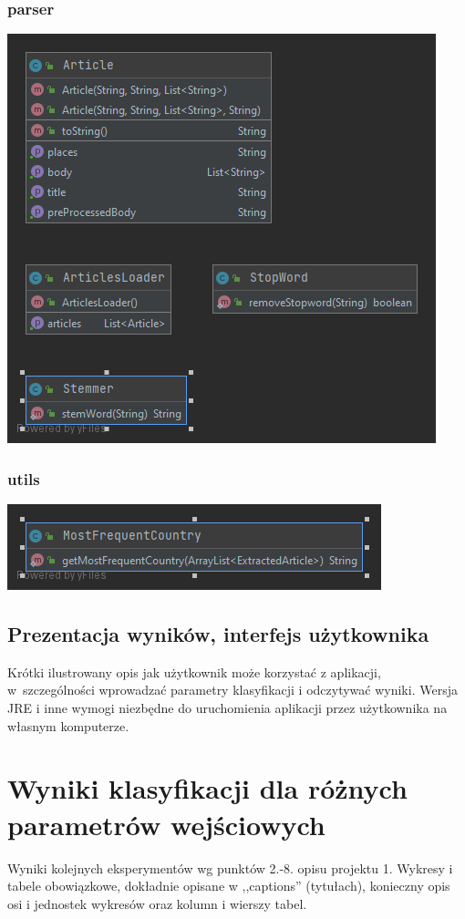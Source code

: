 \documentclass{classrep}
\begin{document}
\subsubsection{parser}
\includegraphics[scale=0.5]{Package parser}
\subsubsection{utils}
\includegraphics[scale=0.5]{Package utils}

\subsection{Prezentacja wyników, interfejs użytkownika} 
Krótki ilustrowany opis jak użytkownik może korzystać z aplikacji, w~szczególności wprowadzać parametry klasyfikacji i odczytywać wyniki. Wersja JRE i inne wymogi
niezbędne do uruchomienia aplikacji przez użytkownika na własnym komputerze. \\

\section{Wyniki klasyfikacji dla różnych parametrów wejściowych}
Wyniki kolejnych eksperymentów wg punktów 2.-8. opisu projektu 1.  Wykresy i tabele
obowiązkowe, dokładnie opisane w ,,captions'' (tytułach), konieczny opis osi i
jednostek wykresów oraz kolumn i wierszy tabel.\\ 
\end{document}
